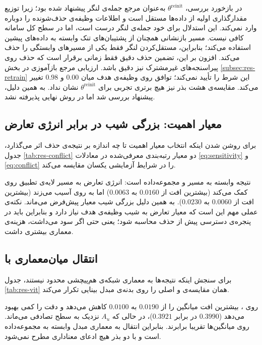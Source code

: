 در بازخورد بررسی، $\theta^{\mathrm{reinit}}$ به‌عنوان مرجع جمله‌ی لنگر پیشنهاد شده بود؛ زیرا توزیع مقدارگذاری اولیه از داده‌ها مستقل است و اطلاعات وظیفه‌ی حذف‌شونده را دوباره وارد نمی‌کند. این استدلال برای خود جمله‌ی لنگر درست است، اما در سطح کل سامانه کافی نیست. مسیر بازنشانی  همچنان از پشتیبان‌های تنک وابسته به داده‌های پیشین استفاده می‌کند؛ بنابراین، مستقل‌کردن لنگر فقط یکی از مسیرهای وابستگی را حذف می‌کند. افزون بر این، تضمین حذف دقیق فقط زمانی برقرار است که حذف روی پیراسنجه‌های غیرمشترک نیز دقیق باشد. ارزیابی مرجع بازآموزی در بخش \ref{subsec:res-retrain} این شرط را تأیید نمی‌کند؛ توافق روی وظیفه‌ی هدف میان $0.00$ و $0.98$ تغییر می‌کند. مقایسه‌ی هشت بذر نیز هیچ برتری تجربی برای $\theta^{\mathrm{reinit}}$ نشان نداد. به همین دلیل، پیشنهاد بررسی شد اما در روش نهایی پذیرفته نشد.

\subsection{معیار اهمیت: بزرگی شیب در برابر انرژی تعارض}
\label{subsec:res-conflict}

برای روشن شدن اینکه انتخاب معیار اهمیت تا چه اندازه بر نتیجه‌ی حذف اثر می‌گذارد، جدول \ref{tab:res-conflict} دو معیار رتبه‌بندی معرفی‌شده در معادلات \eqref{eq:sensitivity} و \eqref{eq:conflict} را در شرایط آزمایشی یکسان مقایسه می‌کند.



نتیجه وابسته به مسیر و مجموعه‌داده است: انرژی تعارض به مسیر لایه‌ی تطبیق روی  کمک می‌کند (بیشترین افت از $0.0160$ به $0.0063$) اما به  روی  آسیب می‌زند (بیشترین افت از $0.0060$ به $0.0230$). به همین دلیل بزرگی شیب معیار پیش‌فرض می‌ماند. نکته‌ی عملی مهم این است که معیار تعارض به شیب وظیفه‌ی هدف نیاز دارد و بنابراین باید در پنجره‌ی دسترسی پیش از حذف محاسبه شود؛ یعنی حتی اگر سود می‌داشت، هزینه‌ی معماری بیشتری داشت.

\subsection{انتقال میان‌معماری با }
\label{subsec:res-vit}

برای سنجش اینکه نتیجه‌ها به معماری شبکه‌ی هم‌پیچشی محدود نیستند، جدول \ref{tab:res-vit} همان مقایسه‌ی  و  اصلی را روی بدنه‌ی مبدل بینایی  \cite{dosovitskiy2021vit} تکرار می‌کند.



روی ،  بیشترین افت میانگین را از $0.0190$ به $0.0100$ کاهش می‌دهد و دقت را کمی بهبود می‌دهد ($0.3990$ در برابر $0.3921$)، در حالی که $A_u$ نزدیک به سطح تصادفی می‌ماند. روی  میانگین‌ها تقریبا برابرند. بنابراین انتقال به معماری مبدل وابسته به مجموعه‌داده است و با دو بذر هیچ ادعای معناداری مطرح نمی‌شود.

